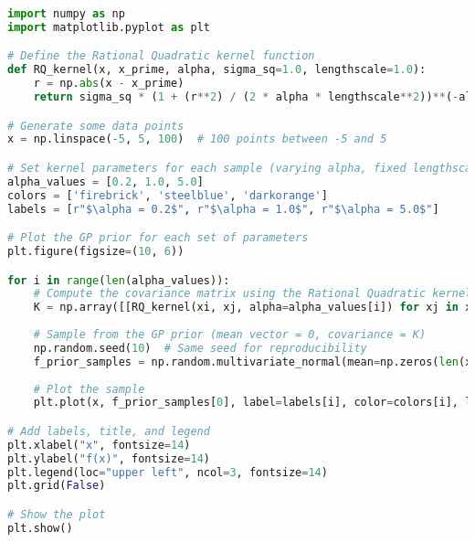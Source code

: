 \documentclass[12pt,a4paper]{article}
\begin{document}
\vspace{10pt}
\begin{lstlisting}[language=python, caption={Code of the Creation of Figures \ref{fig:RQ samples diff alpha plot}}]
import numpy as np
import matplotlib.pyplot as plt

# Define the Rational Quadratic kernel function
def RQ_kernel(x, x_prime, alpha, sigma_sq=1.0, lengthscale=1.0):
    r = np.abs(x - x_prime)
    return sigma_sq * (1 + (r**2) / (2 * alpha * lengthscale**2))**(-alpha)

# Generate some data points
x = np.linspace(-5, 5, 100)  # 100 points between -5 and 5

# Set kernel parameters for each sample (varying alpha, fixed lengthscale and variance)
alpha_values = [0.2, 1.0, 5.0]
colors = ['firebrick', 'steelblue', 'darkorange']
labels = [r"$\alpha = 0.2$", r"$\alpha = 1.0$", r"$\alpha = 5.0$"]

# Plot the GP prior for each set of parameters
plt.figure(figsize=(10, 6))

for i in range(len(alpha_values)):
    # Compute the covariance matrix using the Rational Quadratic kernel
    K = np.array([[RQ_kernel(xi, xj, alpha=alpha_values[i]) for xj in x] for xi in x])
    
    # Sample from the GP prior (mean vector = 0, covariance = K)
    np.random.seed(10)  # Same seed for reproducibility
    f_prior_samples = np.random.multivariate_normal(mean=np.zeros(len(x)), cov=K, size=1)
    
    # Plot the sample
    plt.plot(x, f_prior_samples[0], label=labels[i], color=colors[i], linewidth=3)

# Add labels, title, and legend
plt.xlabel("x", fontsize=14)
plt.ylabel("f(x)", fontsize=14)
plt.legend(loc="upper left", ncol=3, fontsize=14)
plt.grid(False)

# Show the plot
plt.show()
\end{lstlisting}
\end{document}
